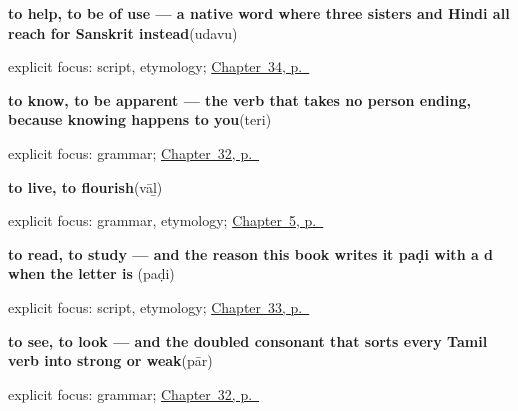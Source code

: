 \noindent\begin{minipage}[t]{\linewidth}
\raggedright
\textbf{to help, to be of use — a native word where three sisters and Hindi all reach for Sanskrit instead}\enspace\emph{}\enspace(udavu)\par
\footnotesize explicit focus: script, etymology; \hyperref[ch:ta-verbs-between-people]{Chapter~34, p.~\pageref*{ch:ta-verbs-between-people}}
\end{minipage}\par\smallskip

\noindent\begin{minipage}[t]{\linewidth}
\raggedright
\textbf{to know, to be apparent — the verb that takes no person ending, because knowing happens to you}\enspace\emph{}\enspace(teri)\par
\footnotesize explicit focus: grammar; \hyperref[ch:ta-core-verbs]{Chapter~32, p.~\pageref*{ch:ta-core-verbs}}
\end{minipage}\par\smallskip

\noindent\begin{minipage}[t]{\linewidth}
\raggedright
\textbf{to live, to flourish}\enspace\emph{}\enspace(vāḻ)\par
\footnotesize explicit focus: grammar, etymology; \hyperref[ch:first-verbs]{Chapter~5, p.~\pageref*{ch:first-verbs}}
\end{minipage}\par\smallskip

\noindent\begin{minipage}[t]{\linewidth}
\raggedright
\textbf{to read, to study — and the reason this book writes it paḍi with a d when the letter is }\enspace\emph{}\enspace(paḍi)\par
\footnotesize explicit focus: script, etymology; \hyperref[ch:ta-verbs-of-the-mind]{Chapter~33, p.~\pageref*{ch:ta-verbs-of-the-mind}}
\end{minipage}\par\smallskip

\noindent\begin{minipage}[t]{\linewidth}
\raggedright
\textbf{to see, to look — and the doubled consonant that sorts every Tamil verb into strong or weak}\enspace\emph{}\enspace(pār)\par
\footnotesize explicit focus: grammar; \hyperref[ch:ta-core-verbs]{Chapter~32, p.~\pageref*{ch:ta-core-verbs}}
\end{minipage}\par\smallskip

